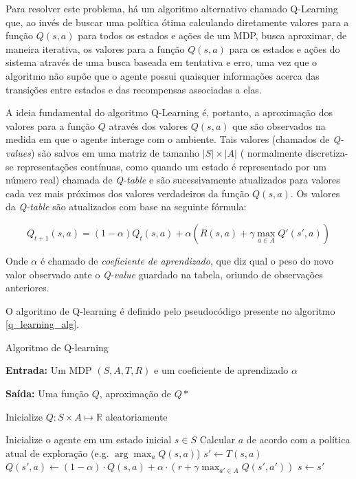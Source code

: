 \documentclass[cic,tc]{iiufrgs}
\begin{document}
Para resolver este problema, há um algoritmo alternativo chamado Q-Learning que,
ao invés de buscar uma política ótima calculando diretamente valores para a
função $Q(s, a)$ para todos os estados e ações de um MDP, busca aproximar, de
maneira iterativa, os valores para a função $Q(s, a)$ para os estados e ações do
sistema através de uma busca baseada em tentativa e erro, uma vez que o algoritmo
não supõe que o agente possui quaisquer informações acerca das transições entre
estados e das recompensas associadas a elas.


A ideia fundamental do algoritmo Q-Learning é, portanto, a aproximação dos
valores para a função $Q$ através dos valores $Q(s, a)$ que são observados na
medida em que o agente interage com o ambiente. Tais valores (chamados de
\textit{Q-values}) são salvos em uma matriz de tamanho $|S| \times |A|$ (
normalmente discretiza-se representações contínuas, como quando um estado é
representado por um número real) chamada de \textit{Q-table} e são
sucessivamente atualizados para valores cada vez mais próximos dos valores
verdadeiros da função $Q(s, a)$. Os valores da \textit{Q-table} são atualizados
com base na seguinte fórmula:

\begin{equation}
  \label{q_learning_update}
  Q_{t+1}(s, a) = (1 - \alpha)Q_t(s, a) + \alpha(R(s, a) + \gamma\max_{a \in A}Q'(s', a))
\end{equation}

Onde $\alpha$ é chamado de \textit{coeficiente de aprendizado}, que diz qual o
peso do novo valor observado ante o \textit{Q-value} guardado na tabela, oriundo
de observações anteriores.

O algoritmo de Q-learning é definido pelo pseudocódigo presente no algoritmo
\ref{q_learning_alg}.


\begin{algorithm}
  \label{q_learning_alg}
\caption{Algoritmo de Q-learning}

\textbf{Entrada:}  Um MDP $(S, A, T, R)$ e um coeficiente de aprendizado $\alpha$


\textbf{Saída:} Uma função $Q$, aproximação de $Q*$


\begin{algorithmic}[1]
  \State Inicialize $Q: S \times A\mapsto \mathbb{R} $ aleatoriamente

  \Repeat
    \State Inicialize o agente em um estado inicial $s \in S$
      \State Calcular $a$ de acordo com a política atual de exploração (e.g. $\arg \max_a Q(s,a)$)
      \State $s' \gets T(s, a)$
      \State $Q(s', a) \gets (1 - \alpha)\cdot Q(s,a) + \alpha \cdot (r + \gamma\max_{a' \in A}Q(s', a'))$
      \State $s \gets s'$
    \EndWhile
\EndFunction
\end{algorithmic}
\end{algorithm}
\end{document}
